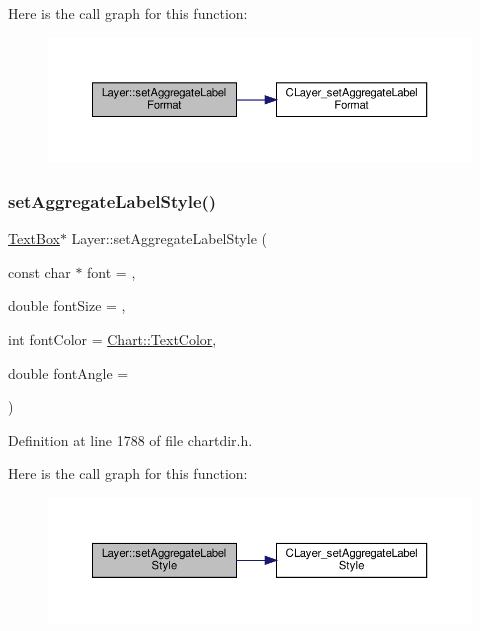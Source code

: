 Here is the call graph for this function\+:
\nopagebreak
\begin{figure}[H]
\begin{center}
\leavevmode
\includegraphics[width=350pt]{class_layer_a30589e1186d9fb1abcbc03782fbb1ae4_cgraph}
\end{center}
\end{figure}
\mbox{\label{class_layer_a924df6a49e4fa18109cae3afd16eaf8f}} 
\subsubsection{\texorpdfstring{set\+Aggregate\+Label\+Style()}{setAggregateLabelStyle()}}
{\footnotesize\ttfamily \hyperlink{class_text_box}{Text\+Box}$\ast$ Layer\+::set\+Aggregate\+Label\+Style (\begin{DoxyParamCaption}\item[{const char $\ast$}]{font = {},  }\item[{double}]{font\+Size = {},  }\item[{int}]{font\+Color = {\ttfamily \hyperlink{namespace_chart_abee0d882fdc9ad0b001245ad9fc64011a879e14f2f5024caccc047374342321ef}{Chart\+::\+Text\+Color}},  }\item[{double}]{font\+Angle = {} }\end{DoxyParamCaption})\hspace{0.3cm}{\ttfamily [inline]}}



Definition at line 1788 of file chartdir.\+h.

Here is the call graph for this function\+:
\nopagebreak
\begin{figure}[H]
\begin{center}
\leavevmode
\includegraphics[width=350pt]{class_layer_a924df6a49e4fa18109cae3afd16eaf8f_cgraph}
\end{center}
\end{figure}
\mbox{\label{class_layer_a62eada97375feac765004c6a99095531}} 
